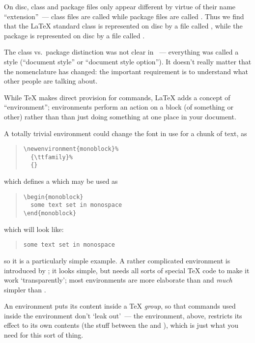 On disc, class and package files only appear different by virtue of
their name ``extension''~--- class files are called  while
package files are called .  Thus we find that the \LaTeX{}
standard  class is represented on disc by a file called
, while the  package is
represented on disc by a file called .

The class vs.~package distinction was not clear in \LaTeXo{}~---
everything was called a style (``document style'' or ``document style
option'').  It doesn't really matter that the nomenclature has
changed: the important requirement is to understand what other people
are talking about.


While \TeX{} makes direct provision for commands, \LaTeX{} adds a
concept of ``environment''; environments perform an action on a block
(of something or other) rather than than just doing something at one
place in your document.

A totally trivial environment could change the font in use for a chunk
of text, as
\begin{quote}
\begin{verbatim}
\newenvironment{monoblock}%
  {\ttfamily}%
  {}
\end{verbatim}
\end{quote}
which defines a  which may be used as
\begin{quote}
\begin{verbatim}
\begin{monoblock}
  some text set in monospace
\end{monoblock}
\end{verbatim}
\end{quote}
which will look like:
\begin{quote}
  \texttt{some text set in monospace}
\end{quote}
so it is a particularly simple example.  A rather complicated
environment is introduced by ; it looks
simple, but needs all sorts of special \TeX{} code to make it work
`transparently'; most environments are more elaborate than
 and \emph{much} simpler than
.

An environment puts its content inside a \TeX{} \emph{group}, so that
commands used inside the environment don't `leak out'~--- the
 environment, above, restricts its effect to
its own contents (the stuff between the 
and ), which is just what you need for this
sort of thing.


